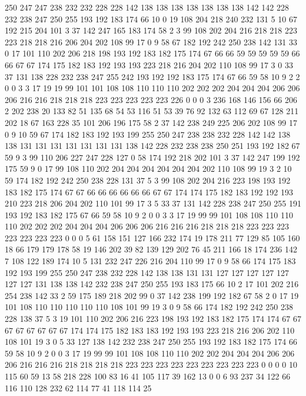 250 247 247 238 232 232 228 228 142 138 138 138 138 138 138 138 142 142 228 232
238 247 250 255 193 192 183 174 66 10 0 19 108 204 218 240 232 131 5 10
67 192 215 204 101 3 37 142 247 165 183 174 58 2 3 99 108 202 204 216
218 218 223 223 218 218 216 206 204 202 108 99 17 0 9 58 67 182 192 242
250 238 142 131 33 0 17 101 110 202 206 218 198 193 192 183 182 175 174 67
66 66 59 59 59 59 59 66 66 67 67 174 175 182 183 192 193 193 223 218
216 204 202 110 108 99 17 3 0 33 37 131 138 228 232 238 247 255 242 193
192 192 183 175 174 67 66 59 58 10 9 2 2 0 0 3 3 17 19 19
99 101 101 108 108 110 110 110 202 202 202 204 204 204 206 206 206 216 216 218
218 218 223 223 223 223 223 226 0 0 0 3 236 168 146 156 66 206 2 202
238 20 133 82 51 135 68 54 53 116 51 53 39 76 92 132 63 112 69 67
128 211 202 18 67 163 228 35 101 206 196 175 58 2 37 142 238 249 225 206
202 108 99 17 0 9 10 59 67 174 182 183 192 193 199 255 250 247 238 238
232 228 142 142 138 138 131 131 131 131 131 131 131 138 142 228 232 238 238 250
251 193 192 182 67 59 9 3 99 110 206 227 247 228 127 0 58 174 192 218
202 101 3 37 142 247 199 192 175 59 9 0 17 99 108 110 202 204 204 204
204 204 204 202 110 108 99 19 3 2 10 59 174 182 192 242 250 238 228 131
37 5 3 99 108 202 204 216 223 198 193 192 183 182 175 174 67 67 66 66
66 66 66 66 67 67 174 174 175 182 183 192 192 193 210 223 218 206 204 202
110 101 99 17 3 5 33 37 131 142 228 238 247 250 255 191 193 192 183 182
175 67 66 59 58 10 9 2 0 0 3 3 17 19 99 99 101 108 108 110
110 110 202 202 202 204 204 204 206 206 206 216 216 216 218 218 218 223 223 223
223 223 223 223 0 0 0 5 61 158 151 127 166 232 174 19 178 211 77 129
85 105 160 18 66 179 179 178 58 19 146 202 39 82 139 129 202 76 45 211
166 18 174 236 142 7 108 122 189 174 10 5 131 232 247 226 216 204 110 99
17 0 9 58 66 174 175 183 192 193 199 255 250 247 238 232 228 142 138 138
131 131 127 127 127 127 127 127 127 131 138 138 142 232 238 247 250 255 193 183
175 66 10 2 17 101 202 216 254 238 142 33 2 59 175 189 218 202 99 0
37 142 238 199 192 182 67 58 2 0 17 19 101 108 110 110 110 110 110 108
101 99 19 3 0 9 58 66 174 182 192 242 250 238 228 138 37 5 3 19
101 110 202 206 216 223 198 193 192 183 182 175 174 174 67 67 67 67 67 67
67 67 174 174 175 182 183 183 192 193 193 223 218 216 206 202 110 108 101 19
3 0 5 33 127 138 142 232 238 247 250 255 193 192 183 182 175 174 66 59
58 10 9 2 0 0 3 17 19 99 99 101 108 108 110 110 202 202 204 204
204 206 206 206 216 216 216 218 218 218 218 223 223 223 223 223 223 223 223 223
0 0 0 0 10 115 60 59 13 58 218 228 100 83 16 41 105 117 39 162
13 0 0 6 93 237 34 122 66 116 110 128 232 62 114 77 41 118 114 25
